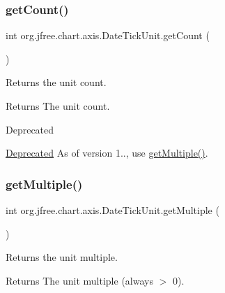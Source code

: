 \subsubsection{\texorpdfstring{get\+Count()}{getCount()}}
{\footnotesize\ttfamily int org.\+jfree.\+chart.\+axis.\+Date\+Tick\+Unit.\+get\+Count (\begin{DoxyParamCaption}{ }\end{DoxyParamCaption})}

Returns the unit count.

\begin{DoxyReturn}{Returns}
The unit count.
\end{DoxyReturn}
\begin{DoxyRefDesc}{Deprecated}
\item[\mbox{\hyperlink{deprecated__deprecated000019}{Deprecated}}]As of version 1.., use \mbox{\hyperlink{classorg_1_1jfree_1_1chart_1_1axis_1_1_date_tick_unit_a318953fca38873f272ba969ba7547eba}{get\+Multiple()}}. \end{DoxyRefDesc}
\mbox{\label{classorg_1_1jfree_1_1chart_1_1axis_1_1_date_tick_unit_a318953fca38873f272ba969ba7547eba}} 
\subsubsection{\texorpdfstring{get\+Multiple()}{getMultiple()}}
{\footnotesize\ttfamily int org.\+jfree.\+chart.\+axis.\+Date\+Tick\+Unit.\+get\+Multiple (\begin{DoxyParamCaption}{ }\end{DoxyParamCaption})}

Returns the unit multiple.

\begin{DoxyReturn}{Returns}
The unit multiple (always $>$ 0). 
\end{DoxyReturn}
\mbox{\label{classorg_1_1jfree_1_1chart_1_1axis_1_1_date_tick_unit_a2d0ef9ef9d9c7b1f3a00e1e0b7ffe16b}} 
